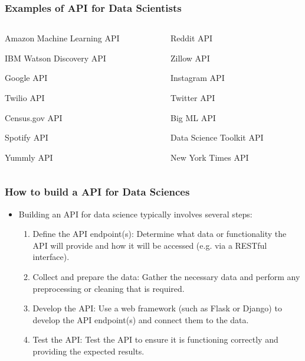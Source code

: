 \documentclass[aspectratio=169]{beamer}
\begin{document}
\begin{frame}
    \frametitle{Examples of API for Data Scientists}
            \begin{enumerate}
                \begin{columns}
                    \begin{column}{0.5\linewidth}
                        \item Amazon Machine Learning API
                        \item IBM Watson Discovery API
                        \item Google API
                        \item Twilio API
                        \item Census.gov API
                        \item Spotify API
                        \item Yummly API          
                    \end{column}
                    \begin{column}{0.5\linewidth}
                        \item Reddit API
                        \item Zillow API
                        \item Instagram API
                        \item Twitter API
                        \item Big ML API
                        \item Data Science Toolkit API 
                        \item New York Times API
                    \end{column}
                \end{columns}
            \end{enumerate}
\end{frame}

\begin{frame}
    \frametitle{How to build a API for Data Sciences}
    \begin{itemize}
        \item Building an API for data science typically involves several steps:
        \begin{enumerate}
            \item Define the API endpoint(s): Determine what data or functionality the API will provide and how it will be accessed (e.g. via a RESTful interface).
            \item Collect and prepare the data: Gather the necessary data and perform any preprocessing or cleaning that is required.
            \item Develop the API: Use a web framework (such as Flask or Django) to develop the API endpoint(s) and connect them to the data.
            \item Test the API: Test the API to ensure it is functioning correctly and providing the expected results.
        \end{enumerate}
    \end{itemize}    
\end{frame}
\end{document}
